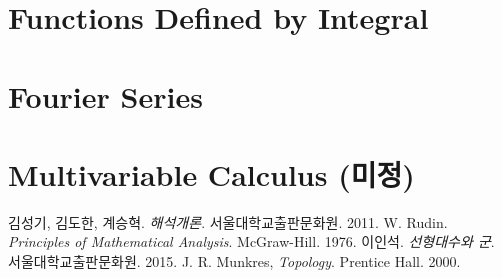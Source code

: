 \documentclass[12pt]{article}
\theoremstyle{definition}
\begin{document}
\section{Functions Defined by Integral}

\section{Fourier Series}

\section{Multivariable Calculus (미정)}


\begin{thebibliography}{99}
	
	\label{ref1} 김성기, 김도한, 계승혁. \emph{해석개론}. 서울대학교출판문화원. 2011.
	\label{ref2} W. Rudin. \emph{Principles of Mathematical Analysis}. McGraw-Hill. 1976.
	 이인석. \emph{선형대수와 군}. 서울대학교출판문화원. 2015.
	 J. R. Munkres, \emph{Topology}. Prentice Hall. 2000.
		
\end{thebibliography}
\end{document}
